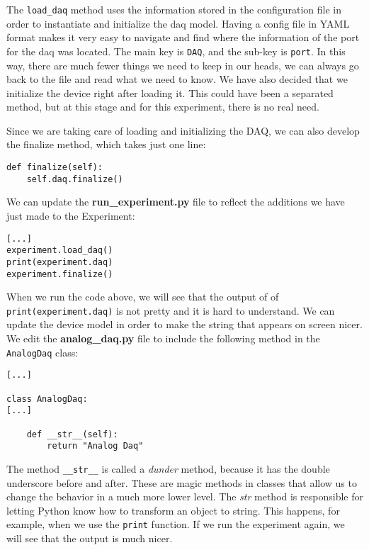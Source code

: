 The \texttt{load_daq} method uses the information stored in the configuration file in order to instantiate and initialize the daq model. Having a config file in YAML format makes it very easy to navigate and find where the information of the port for the daq was located. The main key is \texttt{DAQ}, and the sub-key is \texttt{port}. In this way, there are much fewer things we need to keep in our heads, we can always go back to the file and read what we need to know. We have also decided that we initialize the device right after loading it. This could have been a separated method, but at this stage and for this experiment, there is no real need. 

Since we are taking care of loading and initializing the DAQ, we can also develop the finalize method, which takes just one line:

\begin{verbatim}
def finalize(self):
    self.daq.finalize()
\end{verbatim}

We can update the \textbf{run\_experiment.py} file to reflect the additions we have just made to the Experiment:

\begin{verbatim}
[...]
experiment.load_daq()
print(experiment.daq)
experiment.finalize()
\end{verbatim}

When we run the code above, we will see that the output of of \texttt{print(experiment.daq)} is not pretty and it is hard to understand. We can update the device model in order to make the string that appears on screen nicer. We edit the \textbf{analog\_daq.py} file to include the following method in the \texttt{AnalogDaq} class:

\begin{verbatim}
[...]

class AnalogDaq:
[...]

    def __str__(self):
        return "Analog Daq"
\end{verbatim}

The method \texttt{\_\_str\_\_} is called a \emph{dunder} method, because it has the double underscore before and after. These are magic methods in classes that allow us to change the behavior in a much more lower level. The \emph{str} method is responsible for letting Python know how to transform an object to string. This happens, for example, when we use the \texttt{print} function. If we run the experiment again, we will see that the output is much nicer. 

